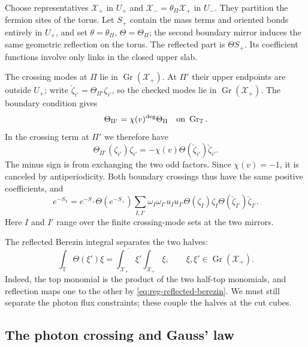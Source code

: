 \documentclass[11pt,letterpaper,reqno]{amsart}
\begin{document}
Choose representatives $\mathcal X_+$ in $U_+$ and
$\mathcal X_-=\theta_\Pi\mathcal X_+$ in $U_-$. They partition the
fermion sites of the torus. Let $S_+$ contain the mass terms and
oriented bonds entirely in $U_+$, and set
$\theta=\theta_\Pi$, $\Theta=\Theta_\Pi$; the second boundary mirror
induces the same geometric reflection on the torus.
The reflected part is $\Theta S_+$. Its coefficient functions
involve only links in the closed upper slab.

The crossing modes at $\Pi$ lie in
$\operatorname{Gr}(\mathcal X_+)$. At $\Pi'$ their upper endpoints
are outside $U_+$; write
$\check\zeta_{i'}=\Theta_{\Pi'}\zeta_{i'}$, so the checked modes
lie in $\operatorname{Gr}(\mathcal X_+)$. The boundary condition gives
\begin{equation}\label{eq:reg-second-reflection}
 \Theta_{\Pi'}=\chi(v)^{\deg}\Theta_\Pi
                 \quad\hbox{on }\operatorname{Gr}_{\mathbb T}.
\end{equation}
In the crossing term at $\Pi'$ we therefore have
\[
 \Theta_{\Pi'}(\zeta_{i'})\zeta_{i'}
 =-\chi(v)\Theta(\check\zeta_{i'})\check\zeta_{i'}.
\]
The minus sign is from exchanging the two odd factors. Since
$\chi(v)=-1$, it is canceled by antiperiodicity. Both boundary
crossings thus have the same positive coefficients, and
\begin{equation}\label{eq:reg-two-crossings}
 e^{-S_{\mathbb T}}=e^{-S_+}\Theta(e^{-S_+})
 \sum_{I,I'}\omega_I\omega_{I'}u_Iu_{I'}
       \Theta(\zeta_I)\zeta_I
       \Theta(\check\zeta_{I'})\check\zeta_{I'}.
\end{equation}
Here $I$ and $I'$ range over the finite crossing-mode sets at the
two mirrors.

The reflected Berezin integral separates the two halves:
\begin{equation}\label{eq:reg-half-berezin}
 \int_{\mathbb T}\Theta(\xi')\xi
 =\overline{\int_{\mathcal X_+}\xi'}
                  \int_{\mathcal X_+}\xi,
 \qquad \xi,\xi'\in\operatorname{Gr}(\mathcal X_+).
\end{equation}
Indeed, the top monomial is the product of the two half-top
monomials, and reflection maps one to the other by
\eqref{eq:reg-reflected-berezin}. We must still separate the photon
flux constraints; these couple the halves at the cut cubes.

\subsection{The photon crossing and Gauss' law}\label{subsec:reg-gauss}
\end{document}
